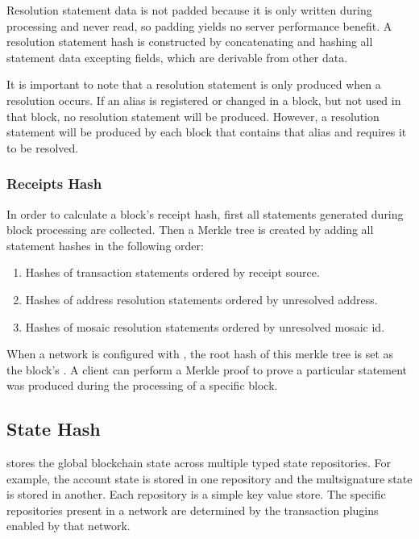 Resolution statement data is not padded because it is only written during processing and never read, so padding yields no server performance benefit.
A resolution statement hash is constructed by concatenating and hashing all statement data excepting  fields, which are derivable from other data.

It is important to note that a resolution statement is only produced when a resolution occurs.
If an alias is registered or changed in a block, but not used in that block, no resolution statement will be produced.
However, a resolution statement will be produced by each block that contains that alias and requires it to be resolved.

\subsubsection{Receipts Hash}
\label{sec:blocks:receiptshash}

In order to calculate a block's receipt hash, first all statements generated during block processing are collected.
Then a Merkle tree is created by adding all statement hashes in the following order:

\begin{enumerate}
	\item{Hashes of transaction statements ordered by receipt source.}
	\item{Hashes of address resolution statements ordered by unresolved address.}
	\item{Hashes of mosaic resolution statements ordered by unresolved mosaic id.}
\end{enumerate}

When a network is configured with , the root hash of this merkle tree is set as the block's .
A client can perform a Merkle proof to prove a particular statement was produced during the processing of a specific block.

\subsection{State Hash}
\label{sec:blocks:statehash}

\codenamespace stores the global blockchain state across multiple typed state repositories.
For example, the account state is stored in one repository and the multsignature state is stored in another.
Each repository is a simple key value store.
The specific repositories present in a network are determined by the transaction plugins enabled by that network.

